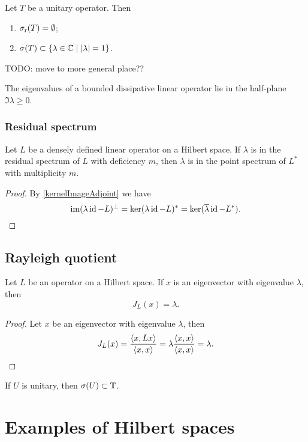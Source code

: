 \begin{proposition}
Let $T$ be a unitary operator. Then
\begin{enumerate}
\item $\sigma_\text{r}(T) = \emptyset$;
\item $\spec(T) \subset \setbuilder{\lambda\in\C}{|\lambda| = 1}$.
\end{enumerate}
\end{proposition}
TODO: move to more general place??

\begin{lemma}
The eigenvalues of a bounded dissipative linear operator
lie in the half-plane $\Im\lambda \geq 0$.
\end{lemma}


\subsubsection{Residual spectrum}
\begin{proposition}
Let $L$ be a densely defined linear operator on a Hilbert space. If $\lambda$ is in the residual spectrum of $L$ with deficiency $m$, then $\overline{\lambda}$ is in the point spectrum of $L^*$ with multiplicity $m$.
\end{proposition}
\begin{proof}
By \ref{kernelImageAdjoint} we have
\[ \operatorname{im}(\lambda \operatorname{id} - L)^\perp = \ker(\lambda\operatorname{id} - L)^* = \ker(\overline{\lambda}\operatorname{id} - L^*). \]
\end{proof}

\subsection{Rayleigh quotient}
\begin{lemma}
Let $L$ be an operator on a Hilbert space. If $x$ is an eigenvector with eigenvalue $\lambda$, then
\[ J_L(x) = \lambda. \]
\end{lemma}
\begin{proof}
Let $x$ be an eigenvector with eigenvalue $\lambda$, then
\[ J_L(x) = \frac{\left\langle x,Lx \right\rangle}{\left\langle x,x \right\rangle} = \lambda \frac{\left\langle x,x \right\rangle}{\left\langle x,x \right\rangle} = \lambda. \]
\end{proof}

\begin{proposition}
If $U$ is unitary, then $\sigma(U)\subset \mathbb{T}$.
\end{proposition}

\section{Examples of Hilbert spaces}

